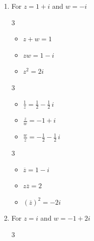 \documentclass{ximera}
\begin{document}
\begin{enumerate}
\item  For $z = 1+i$ and $w = -i$

\begin{multicols}{3}

\begin{itemize}

\item $z+w = 1$

\item $zw = 1-i$

\item $z^2 = 2i$

\end{itemize}

\end{multicols}

\begin{multicols}{3}

\begin{itemize}

\item $\frac{1}{z} = \frac{1}{2} - \frac{1}{2} \, i$

\item $\frac{z}{w} = -1+i$

\item $\frac{w}{z} = -\frac{1}{2} - \frac{1}{2} \, i$

\end{itemize}

\end{multicols}

\begin{multicols}{3}

\begin{itemize}

\item $\overline{z} = 1-i$

\item $z\overline{z} = 2$

\item $(\overline{z})^2 = -2i$

\end{itemize}

\end{multicols}



\item  For  $z = i$ and $w = -1+2i$

\begin{multicols}{3}

\begin{itemize}


\end{itemize}
\end{multicols}
\end{enumerate}
\end{document}
